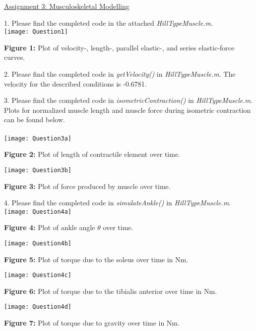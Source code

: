 \documentclass{article}
\begin{document}
\begin{center}\underline{\huge Assignment 3: Musculoskeletal Modelling}\end{center}

1. Please find the completed code in the attached \textit{HillTypeMuscle.m}.\\
\noindent
\texttt{[image: Question1]}
\begin{center}\textbf{Figure 1:} Plot of velocity-, length-, parallel elastic-, and series elastic-force curves.\end{center}

2. Please find the completed code in \textit{getVelocity()} in \textit{HillTypeMuscle.m}. 
The velocity for the described conditions is -0.6781.

3. Please find the completed code in \textit{isometricContraction()} in \textit{HillTypeMuscle.m}. Plots for normalized muscle length and muscle force during isometric contraction can be found below. \\
\\

\noindent
\texttt{[image: Question3a]}
\begin{center}\textbf{Figure 2:} Plot of length of contractile element over time.\end{center}

\noindent
\texttt{[image: Question3b]}
\begin{center}\textbf{Figure 3:} Plot of force produced by muscle over time.\end{center}

4. Please find the completed code in \textit{simulateAnkle()} in \textit{HillTypeMuscle.m}. \\

\noindent
\texttt{[image: Question4a]}
\begin{center}\textbf{Figure 4:} Plot of ankle angle $\theta$ over time.\end{center}

\noindent
\texttt{[image: Question4b]}
\begin{center}\textbf{Figure 5:} Plot of torque due to the soleus over time in Nm.\end{center}

\noindent
\texttt{[image: Question4c]}
\begin{center}\textbf{Figure 6:} Plot of torque due to the tibialis anterior over time in Nm.\end{center}

\noindent
\texttt{[image: Question4d]}
\begin{center}\textbf{Figure 7:} Plot of torque due to gravity over time in Nm.\end{center}
\end{document}
